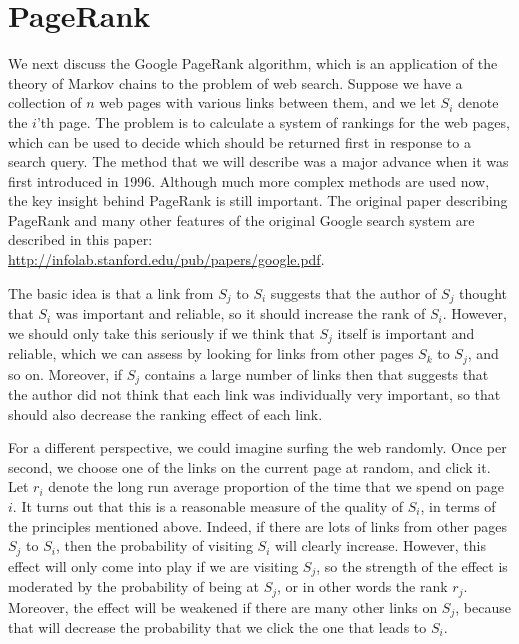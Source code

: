 \documentclass[reqno]{amsart}
\theoremstyle{definition}
\begin{document}
\section{PageRank}

We next discuss the Google PageRank algorithm, which is an application
of the theory of Markov chains to the problem of web search.  Suppose
we have a collection of $n$ web pages with various links between them,
and we let $S_i$ denote the $i$'th page.  The problem is to calculate
a system of rankings for the web pages, which can be used to decide
which should be returned first in response to a search query.  The
method that we will describe was a major advance when it was first
introduced in 1996.  Although much more complex methods are used now,
the key insight behind PageRank is still important.  The original
paper describing PageRank and many other features of the original
Google search system are described in this paper:\\
\url{http://infolab.stanford.edu/pub/papers/google.pdf}.

\medskip

The basic idea is that a link from $S_j$ to $S_i$ suggests that the
author of $S_j$ thought that $S_i$ was important and reliable, so it
should increase the rank of $S_i$.  However, we should only take this
seriously if we think that $S_j$ itself is important and reliable,
which we can assess by looking for links from other pages $S_k$ to
$S_j$, and so on.  Moreover, if $S_j$ contains a large number of links
then that suggests that the author did not think that each link was
individually very important, so that should also decrease the ranking
effect of each link.  

For a different perspective, we could imagine surfing the web
randomly.  Once per second, we choose one of the links on the current
page at random, and click it.  Let $r_i$ denote the long run average
proportion of the time that we spend on page $i$.  It turns out that
this is a reasonable measure of the quality of $S_i$, in terms of the
principles mentioned above.  Indeed, if there are lots of links from
other pages $S_j$ to $S_i$, then the probability of visiting $S_i$
will clearly increase.  However, this effect will only come into play
if we are visiting $S_j$, so the strength of the effect is moderated
by the probability of being at $S_j$, or in other words the rank
$r_j$.  Moreover, the effect will be weakened if there are many other
links on $S_j$, because that will decrease the probability that we
click the one that leads to $S_i$.  
\end{document}
